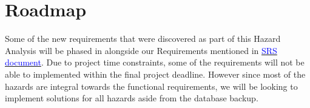 \documentclass{article}
\begin{document}
	\section{Roadmap}
	
	Some of the new requirements that were discovered as part of this Hazard Analysis will be phased in alongside our Requirements mentioned in \href{https://github.com/RutheniumVI/UnderTree/blob/main/docs/SRS/SRS.pdf}{\textcolor{blue}{SRS document}}. Due to project time constraints, some of the requirements will not be able to implemented within the final project deadline. However since most of the hazards are integral towards the functional requirements, we will be looking to implement solutions for all hazards aside from the database backup. 
	
	
	
\end{document}
